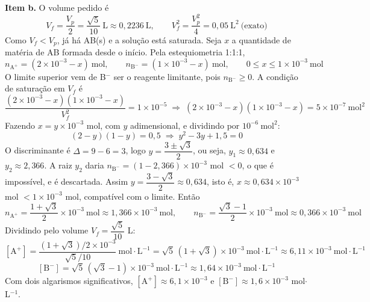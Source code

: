 \documentclass{article}%
\begin{document}
\textbf{Item b.} O volume pedido é
\[
V_f = \frac{V_p}{2} = \frac{\sqrt{5}}{10}\ \text{L} \approx 0{,}2236\ \text{L}, \qquad V_f^2 = \frac{V_p^2}{4} = 0{,}05\ \text{L}^2 \ \text{(exato)}
\]
Como $V_f < V_p$, já há AB(s) e a solução está saturada. Seja $x$ a quantidade de matéria de AB formada desde o início. Pela estequiometria 1:1:1,
\[
n_{\text{A}^+} = (2\times10^{-3} - x)\ \text{mol}, \qquad n_{\text{B}^-} = (1\times10^{-3} - x)\ \text{mol}, \qquad 0 \le x \le 1\times10^{-3}\ \text{mol}
\]
O limite superior vem de B$^-$ ser o reagente limitante, pois $n_{\text{B}^-} \ge 0$. A condição de saturação em $V_f$ é
\[
\frac{(2\times10^{-3} - x)(1\times10^{-3} - x)}{V_f^2} = 1\times10^{-5} \;\Rightarrow\; (2\times10^{-3} - x)(1\times10^{-3} - x) = 5\times10^{-7}\ \text{mol}^2
\]
Fazendo $x = y\times10^{-3}$ mol, com $y$ adimensional, e dividindo por $10^{-6}\ \text{mol}^2$:
\[
(2 - y)(1 - y) = 0{,}5 \;\Rightarrow\; y^2 - 3y + 1{,}5 = 0
\]
O discriminante é $\Delta = 9 - 6 = 3$, logo $y = \dfrac{3 \pm \sqrt{3}}{2}$, ou seja, $y_1 \approx 0{,}634$ e $y_2 \approx 2{,}366$. A raiz $y_2$ daria $n_{\text{B}^-} = (1 - 2{,}366)\times10^{-3}$ mol $< 0$, o que é impossível, e é descartada. Assim $y = \dfrac{3 - \sqrt{3}}{2} \approx 0{,}634$, isto é, $x \approx 0{,}634\times10^{-3}$ mol $< 1\times10^{-3}$ mol, compatível com o limite. Então
\[
n_{\text{A}^+} = \frac{1 + \sqrt{3}}{2}\times10^{-3}\ \text{mol} \approx 1{,}366\times10^{-3}\ \text{mol}, \qquad n_{\text{B}^-} = \frac{\sqrt{3} - 1}{2}\times10^{-3}\ \text{mol} \approx 0{,}366\times10^{-3}\ \text{mol}
\]
Dividindo pelo volume $V_f = \dfrac{\sqrt{5}}{10}$ L:
\[
[\text{A}^+] = \frac{(1+\sqrt{3})/2\times10^{-3}}{\sqrt{5}/10}\ \text{mol}\cdot\text{L}^{-1} = \sqrt{5}\,(1+\sqrt{3})\times10^{-3}\ \text{mol}\cdot\text{L}^{-1} \approx 6{,}11\times10^{-3}\ \text{mol}\cdot\text{L}^{-1}
\]
\[
[\text{B}^-] = \sqrt{5}\,(\sqrt{3}-1)\times10^{-3}\ \text{mol}\cdot\text{L}^{-1} \approx 1{,}64\times10^{-3}\ \text{mol}\cdot\text{L}^{-1}
\]
Com dois algarismos significativos, $[\text{A}^+] \approx 6{,}1\times10^{-3}$ e $[\text{B}^-] \approx 1{,}6\times10^{-3}$ mol$\cdot$L$^{-1}$.
\end{document}
